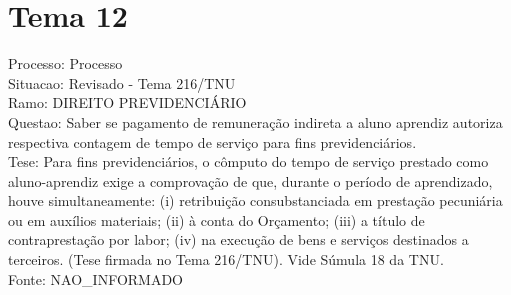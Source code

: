 \documentclass[12pt]{article}
\begin{document}
\section*{Tema 12}
Processo: Processo\\
Situacao: Revisado - Tema 216/TNU\\
Ramo: DIREITO PREVIDENCIÁRIO\\
Questao: Saber se pagamento de remuneração indireta a aluno aprendiz autoriza respectiva contagem de tempo de serviço para fins previdenciários.\\
Tese: Para fins previdenciários, o cômputo do tempo de serviço prestado como aluno-aprendiz exige a comprovação de que, durante o período de aprendizado, houve simultaneamente: (i) retribuição consubstanciada em prestação pecuniária ou em auxílios materiais; (ii) à conta do Orçamento; (iii) a título de contraprestação por labor; (iv) na execução de bens e serviços destinados a terceiros. (Tese firmada no Tema 216/TNU). Vide Súmula 18 da TNU.\\
Fonte: NAO\_INFORMADO
\end{document}
